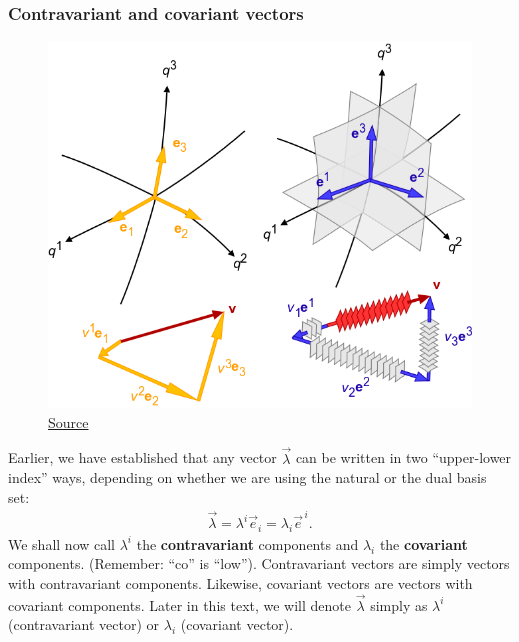 \documentclass{article}
\theoremstyle{definition}
\begin{document}
\subsubsection{Contravariant and covariant vectors}
\begin{figure}[h!]
	\centering
	\includegraphics[scale=0.3]{gr-fig-add1.png}
	\caption*{\href{https://en.wikipedia.org/wiki/Covariance_and_contravariance_of_vectors}{Source}}
\end{figure}
Earlier, we have established that any vector $\vec{\lambda}$ can be written in two ``upper-lower index'' ways, depending on whether we are using the natural or the dual basis set:
\begin{align*}
\vec{\lambda} = \lambda^i\vec{e}_i = \lambda_i\vec{e}^{\,i}.
\end{align*}
We shall now call $\lambda^i$ the \textbf{contravariant} components and $\lambda_i$ the \textbf{covariant} components. (Remember: ``co'' is ``low''). Contravariant vectors are simply vectors with contravariant components. Likewise, covariant vectors are vectors with covariant components. Later in this text, we will denote $\vec{\lambda}$ simply as $\lambda^i$ (contravariant vector) or $\lambda_i$ (covariant vector).\\
\end{document}
